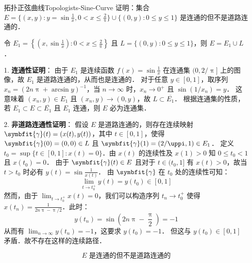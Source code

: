 \begin{problem}{拓扑正弦曲线}{Topologists-Sine-Curve}
    证明：集合 $E = \{(x,y) : y = \sin \frac{1}{x}, 0 < x \leqslant \frac{2}{\uppi}\} \cup \{(0,y) : 0 \leqslant y \leqslant 1\}$ 是连通的但不是道路连通的．

    \begin{center}
    \end{center}
\end{problem}

\begin{myproof}
    令 $E_1 = \left\{ \left(x, \sin \frac{1}{x}\right) : 0 < x \leqslant \frac{2}{\uppi} \right\}$ 且 $L = \{(0, y) : 0 \leqslant y \leqslant 1\}$，则 $E = E_1 \cup L$．

    1. \textbf{连通性证明}：
    由于 $E_1$ 是连续函数 $f(x) = \sin \frac{1}{x}$ 在连通集 $(0, 2/\uppi]$ 上的图像，故 $E_1$ 是道路连通的，从而也是连通的．
    对于任意 $y \in [0, 1]$，取序列 $x_n = \left( 2n\uppi + \arcsin y \right)^{-1}$，当 $n \to \infty$ 时，$x_n \to 0^+$ 且 $\sin(1/x_n) = y$．
    这意味着 $(x_n, y) \in E_1$ 且 $(x_n, y) \to (0, y)$，故 $L \subset \overline{E_1}$．
    根据连通集的性质，若 $E_1 \subset E \subset \overline{E_1}$ 且 $E_1$ 连通，则 $E$ 必为连通集．

    2. \textbf{非道路连通性证明}：
    假设 $E$ 是道路连通的，则存在连续映射 $\symbfit{\gamma}(t) = (x(t), y(t))$，其中 $t \in [0, 1]$，使得 $\symbfit{\gamma}(0) = (0, 0) \in L$ 且 $\symbfit{\gamma}(1) = (2/\uppi, 1) \in E_1$．
    定义 $t_0 = \sup \{ t \in [0, 1] : x(t) = 0 \}$．由 $x(t)$ 的连续性及 $x(1) > 0$ 知 $0 \leqslant t_0 < 1$ 且 $x(t_0) = 0$．
    由于 $\symbfit{\gamma}(t) \in E$ 且对于 $t \in (t_0, 1]$ 有 $x(t) > 0$，故当 $t > t_0$ 时必有 $y(t) = \sin \frac{1}{x(t)}$．
    由 $\symbfit{\gamma}$ 在 $t_0$ 处的连续性可知：
    \begin{equation}
        \lim_{t \to t_0^+} y(t) = y(t_0) \in [0, 1]
    \end{equation}
    然而，由于 $\lim_{t \to t_0^+} x(t) = 0$，我们可以构造序列 $t_n \to t_0^+$ 使得 $x(t_n) = \frac{1}{2n\uppi - \uppi/2}$．此时：
    \begin{equation}
        y(t_n) = \sin\left( 2n\uppi - \frac{\uppi}{2} \right) = -1
    \end{equation}
    从而有 $\lim_{n \to \infty} y(t_n) = -1$，这要求 $y(t_0) = -1$．
    但这与 $y(t_0) \in [0, 1]$ 矛盾．故不存在这样的连续路径．

    \begin{equation}
        \boxed{E \text{ 是连通的但不是道路连通的}}
    \end{equation}
\end{myproof}


